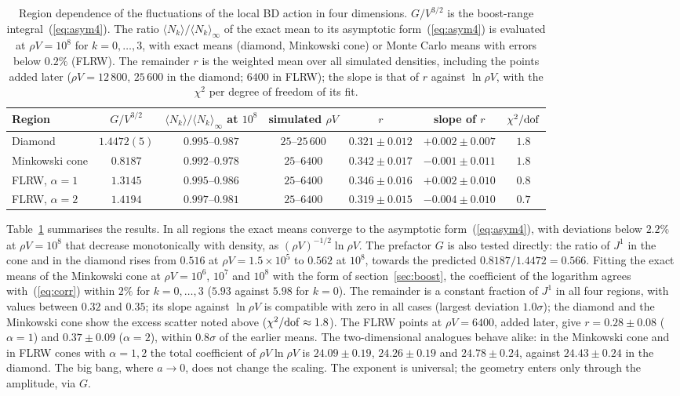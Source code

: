 \documentclass{iopjournal}
\newcommand{\eref}[1]{(\ref{#1})}
\newcommand{\Tref}[1]{Table~\ref{#1}}
\newcommand{\rhoV}{\rho V}
\newcommand{\Jone}{J^{1}}
\begin{document}
\begin{table}
\caption{\label{tab:regions}Region dependence of the fluctuations of the
local BD action in four dimensions. $G/V^{3/2}$ is the boost-range
integral~\eref{eq:asym4}. The ratio $\langle N_k\rangle/\langle N_k\rangle_\infty$
of the exact mean to its asymptotic form~\eref{eq:asym4} is evaluated at
$\rhoV=10^8$ for $k=0,\dots,3$, with exact means (diamond,
Minkowski cone) or Monte Carlo means with errors below $0.2\%$ (FLRW). The
remainder $r$ is the weighted mean over all simulated densities, including the
points added later ($\rhoV=12\,800$, $25\,600$ in the diamond; $6400$ in
FLRW); the slope is that of $r$ against $\ln\rhoV$, with the $\chi^2$ per
degree of freedom of its fit.}
\centering
\begin{tabular}{@{}lcccccc}
\hline
Region & $G/V^{3/2}$ & $\langle N_k\rangle/\langle N_k\rangle_\infty$ at $10^8$ & simulated $\rhoV$ & $r$ & slope of $r$ & $\chi^2/{\rm dof}$\\
\hline
Diamond & $1.4472(5)$ & $0.995$--$0.987$ & $25$--$25\,600$ & $0.321\pm0.012$ & $+0.002\pm0.007$ & $1.8$\\
Minkowski cone & $0.8187$ & $0.992$--$0.978$ & $25$--$6400$ & $0.342\pm0.017$ & $-0.001\pm0.011$ & $1.8$\\
FLRW, $\alpha=1$ & $1.3145$ & $0.995$--$0.986$ & $25$--$6400$ & $0.346\pm0.016$ & $+0.002\pm0.010$ & $0.8$\\
FLRW, $\alpha=2$ & $1.4194$ & $0.997$--$0.981$ & $25$--$6400$ & $0.319\pm0.015$ & $-0.004\pm0.010$ & $0.7$\\
\hline
\end{tabular}
\end{table}

\Tref{tab:regions} summarises the results. In all regions the exact means
converge to the asymptotic form~\eref{eq:asym4}, with deviations below
$2.2\%$ at $\rhoV=10^8$ that decrease monotonically with density, as
$(\rhoV)^{-1/2}\ln\rhoV$. The prefactor $G$ is also tested directly: the ratio
of $\Jone$ in the cone and in the diamond rises from $0.516$ at
$\rhoV=1.5\times10^5$ to $0.562$ at $10^8$, towards the predicted
$0.8187/1.4472=0.566$. Fitting the exact means of the Minkowski cone at
$\rhoV=10^6$, $10^7$ and $10^8$ with the form of section~\ref{sec:boost}, the
coefficient of the logarithm agrees with~\eref{eq:corr} within $2\%$ for
$k=0,\dots,3$ ($5.93$ against $5.98$ for $k=0$). The remainder is a constant fraction of $\Jone$ in all four
regions, with values between $0.32$ and $0.35$; its slope against $\ln\rhoV$
is compatible with zero in all cases (largest deviation $1.0\sigma$); the
diamond and the Minkowski cone show the excess scatter noted above
($\chi^2/{\rm dof}\approx1.8$). The FLRW points at $\rhoV=6400$, added later,
give $r=0.28\pm0.08$ ($\alpha=1$) and $0.37\pm0.09$ ($\alpha=2$), within
$0.8\sigma$ of the earlier means. The two-dimensional analogues behave alike:
in the Minkowski cone and in FLRW cones with $\alpha=1,2$ the total
coefficient of $\rhoV\ln\rhoV$ is $24.09\pm0.19$, $24.26\pm0.19$ and
$24.78\pm0.24$, against $24.43\pm0.24$ in the diamond. The big bang, where
$a\to0$, does not change the scaling. The exponent is universal; the geometry
enters only through the amplitude, via $G$.
\end{document}
